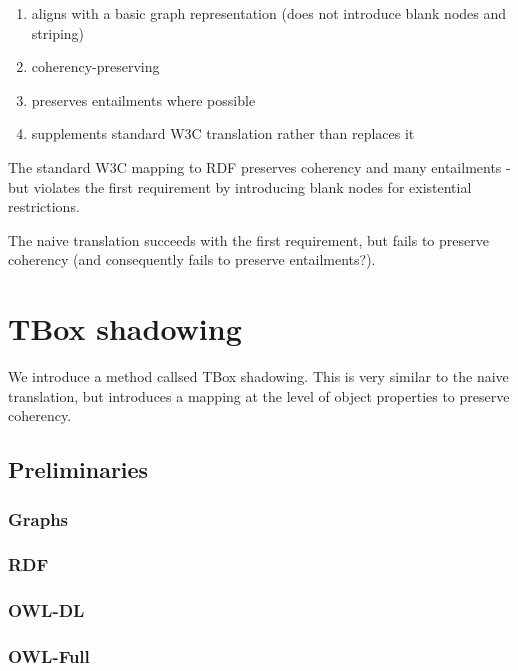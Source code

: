 \documentclass{my}
\begin{document}
\begin{enumerate}

\item aligns with a basic graph representation (does not introduce
  blank nodes and striping)

\item coherency-preserving

\item preserves entailments where possible

\item supplements standard W3C translation rather than replaces it

\end{enumerate}

The standard W3C mapping to RDF preserves coherency and many
entailments - but violates the first requirement by introducing blank
nodes for existential restrictions.

The naive translation succeeds with the first requirement, but fails
to preserve coherency (and consequently fails to preserve
entailments?). 

\section{TBox shadowing}

We introduce a method callsed TBox shadowing. This is very similar to
the naive translation, but introduces a mapping at the level of object
properties to preserve coherency.

\subsection{Preliminaries}

\subsubsection{Graphs}

\subsubsection{RDF}

\subsubsection{OWL-DL}

\subsubsection{OWL-Full}
\end{document}
